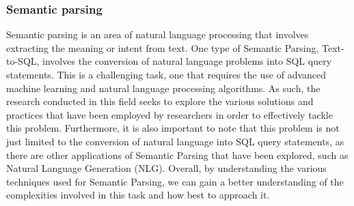 \subsubsection{Semantic parsing}

Semantic parsing\cite{krishnamurthy-etal-2017-neural} is an area of natural language processing that involves extracting the meaning or intent from text. One type of Semantic Parsing, Text-to-SQL, involves the conversion of natural language problems into SQL query statements. This is a challenging task, one that requires the use of advanced machine learning and natural language processing algorithms. As such, the research conducted in this field seeks to explore the various solutions and practices that have been employed by researchers in order to effectively tackle this problem. Furthermore, it is also important to note that this problem is not just limited to the conversion of natural language into SQL query statements, as there are other applications of Semantic Parsing that have been explored, such as Natural Language Generation (NLG). Overall, by understanding the various techniques used for Semantic Parsing, we can gain a better understanding of the complexities involved in this task and how best to approach it.